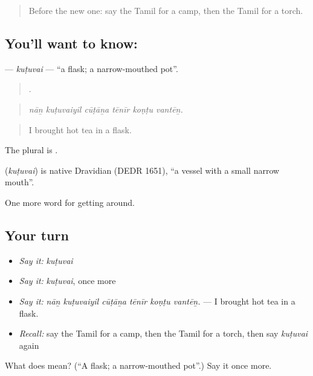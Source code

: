\begin{quote}
Before the new one: say the Tamil for a camp, then the Tamil for a torch.
\end{quote}

\subsection*{You'll want to know: }
\textbf{} — \emph{kuṭuvai} — \textquotedblleft{}a flask; a narrow-mouthed pot\textquotedblright{}.

\begin{quote}
     .
\end{quote}

\begin{quote}
\emph{nāṉ kuṭuvaiyil cūṭāṉa tēnīr koṇṭu vantēṉ.}
\end{quote}

\begin{quote}
I brought hot tea in a flask.
\end{quote}

The plural is .

\begin{cousinweb}
\textbf{} (\emph{kuṭuvai}) is native Dravidian (DEDR 1651), \textquotedblleft{}a vessel with a small narrow mouth\textquotedblright{}.
\end{cousinweb}

\begin{grammarlens}[title={What you've built}]
One more word for getting around.
\end{grammarlens}

\subsection*{Your turn}
\begin{itemize}
\raggedright
  \item \emph{Say it:} \emph{kuṭuvai}
  \item \emph{Say it:} \emph{kuṭuvai}, once more
  \item \emph{Say it:} \emph{nāṉ kuṭuvaiyil cūṭāṉa tēnīr koṇṭu vantēṉ.} — I brought hot tea in a flask.
  \item \emph{Recall:} say the Tamil for a camp, then the Tamil for a torch, then say \emph{kuṭuvai} again
\end{itemize}

\begin{tcolorbox}[breakable,colback=teal!4,colframe=teal!35!black,title={Before you move on}]
What does  mean? (\textquotedblleft{}A flask; a narrow-mouthed pot\textquotedblright{}.) Say it once more.
\end{tcolorbox}
